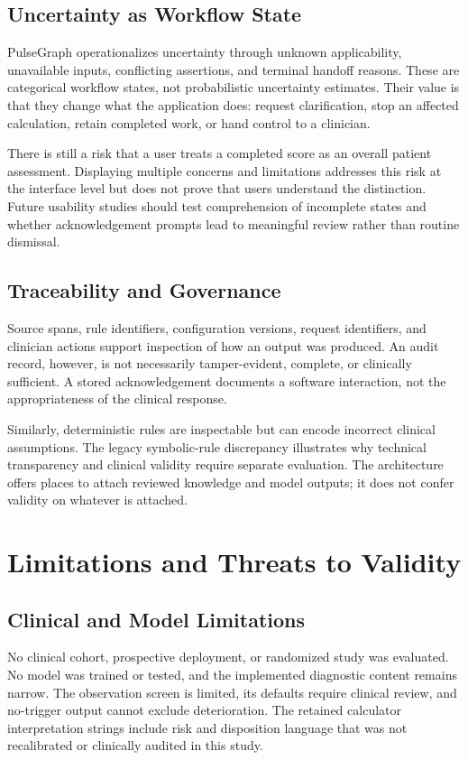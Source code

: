 \documentclass[conference]{IEEEtran}
\begin{document}
\subsection{Uncertainty as Workflow State}
PulseGraph operationalizes uncertainty through unknown applicability, unavailable inputs, conflicting assertions, and terminal handoff reasons. These are categorical workflow states, not probabilistic uncertainty estimates. Their value is that they change what the application does: request clarification, stop an affected calculation, retain completed work, or hand control to a clinician.

There is still a risk that a user treats a completed score as an overall patient assessment. Displaying multiple concerns and limitations addresses this risk at the interface level but does not prove that users understand the distinction. Future usability studies should test comprehension of incomplete states and whether acknowledgement prompts lead to meaningful review rather than routine dismissal.

\subsection{Traceability and Governance}
Source spans, rule identifiers, configuration versions, request identifiers, and clinician actions support inspection of how an output was produced. An audit record, however, is not necessarily tamper-evident, complete, or clinically sufficient. A stored acknowledgement documents a software interaction, not the appropriateness of the clinical response.

Similarly, deterministic rules are inspectable but can encode incorrect clinical assumptions. The legacy symbolic-rule discrepancy illustrates why technical transparency and clinical validity require separate evaluation. The architecture offers places to attach reviewed knowledge and model outputs; it does not confer validity on whatever is attached.

\section{Limitations and Threats to Validity}
\subsection{Clinical and Model Limitations}
No clinical cohort, prospective deployment, or randomized study was evaluated. No model was trained or tested, and the implemented diagnostic content remains narrow. The observation screen is limited, its defaults require clinical review, and no-trigger output cannot exclude deterioration. The retained calculator interpretation strings include risk and disposition language that was not recalibrated or clinically audited in this study.
\end{document}
